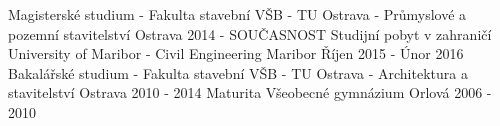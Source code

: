 \vspace{3mm}


\begin{cventries}

  \cventry
    {Magisterské studium - Fakulta stavební}
    {VŠB - TU Ostrava - Průmyslové a pozemní stavitelství}
    {Ostrava}
    {2014 - SOUČASNOST}
    {}
  \cventry
    {Studijní pobyt v zahraničí}
    {University of Maribor - Civil Engineering}
    {Maribor}
    {Říjen 2015 - Únor 2016}
    {}
  \cventry
    {Bakalářské studium - Fakulta stavební} %
    {VŠB - TU Ostrava - Architektura a stavitelství} %
    {Ostrava} %
    {2010 - 2014} %
    {}
  \cventry
    {Maturita} %
    {Všeobecné gymnázium} %
    {Orlová} %
    {2006 - 2010} %
    {}
    
    

\end{cventries}
